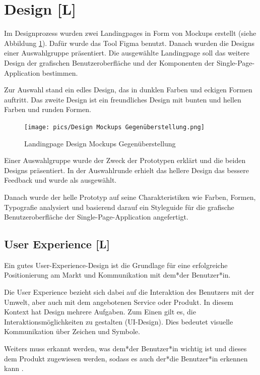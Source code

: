 \section{Design [L]}
Im Designprozess wurden zwei Landingpages in Form von Mockups erstellt (siehe Abbildung \ref{fig:impl:design:mokupsvs}). Dafür wurde das Tool Figma benutzt. Danach wurden die Designs einer Auswahlgruppe präsentiert. Die ausgewählte Landingpage soll das weitere Design der grafischen Benutzeroberfläche und der Komponenten der Single-Page-Application bestimmen.

Zur Auswahl stand ein edles Design, das in dunklen Farben und eckigen Formen auftritt.
Das zweite Design ist ein freundliches Design mit bunten und hellen Farben und runden Formen.

\begin{figure}[h t]
    \centering
    \texttt{[image: pics/Design Mockups Gegenüberstellung.png]}
    \caption{Landingpage Design Mockups Gegenüberstellung}
    \label{fig:impl:design:mokupsvs}
\end{figure}

Einer Auswahlgruppe wurde der Zweck der Prototypen erklärt und die beiden Designs präsentiert. In der Auswahlrunde erhielt das hellere Design das bessere Feedback und wurde als ausgewählt.

Danach wurde der helle Prototyp auf seine Charakteristiken wie Farben, Formen, Typografie analysiert und basierend darauf ein Styleguide für die grafische Benutzeroberfläche der Single-Page-Application angefertigt.

\subsection{User Experience [L]}
Ein gutes User-Experience-Design ist die Grundlage für eine erfolgreiche Positionierung am Markt und Kommunikation mit dem*der Benutzer*in.

Die User Experience bezieht sich dabei auf die Interaktion des Benutzers mit der Umwelt, aber auch mit dem angebotenen Service oder Produkt. In diesem Kontext hat Design mehrere Aufgaben.
Zum Einen gilt es, die Interaktionsmöglichkeiten zu gestalten (UI-Design). Dies bedeutet visuelle Kommunikation über Zeichen und Symbole.

Weiters muss erkannt werden, was dem*der Benutzer*in wichtig ist und dieses dem Produkt zugewiesen werden, sodass es auch der*die Benutzer*in erkennen kann \cite{UserExperienceDesign}.

